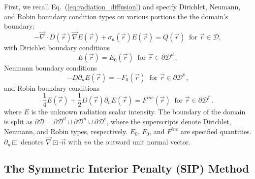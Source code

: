 \documentclass[preprint,10pt]{elsarticle}
\renewcommand{\div}{\vec{\nabla}\! \cdot \!}
\newcommand{\grad}{\vec{\nabla}}
\newcommand{\D}{\mathcal{D}}
\newcommand{\vr}{\vec{r}}
\newcommand{\vn}{\vec{n}}
\newcommand{\eqt}[1]{Eq.~(\ref{#1})}                     %
\begin{document}
First, we recall \eqt{eq:radiation_diffusion} and specify 
Dirichlet, Neumann, and Robin boundary condition types on various portions the the domain's
boundary:
\begin{equation}
  -\div D(\vr) \grad E(\vr) + \sigma_a(\vr) E(\vr) = Q(\vr)\ \textrm{ for } \vr \in \D,
\end{equation}
with Dirichlet boundary conditions
\begin{equation}
  E(\vr)  = E_0(\vr)\ \textrm{ for } \vr \in  \partial \D^d \, ,
\end{equation}
Neumann boundary conditions
\begin{equation}
  -D \partial_n E(\vr) = -F_0(\vr) \ \textrm{ for } \vr \in \partial \D^n,
\end{equation}
and Robin boundary conditions
\begin{equation}
  \frac{1}{4}E(\vr) + \frac{1}{2} D(\vr) \partial_n E(\vr) = F^{inc}(\vr) \ \textrm{ for } \vr \in  \partial \D^r \, .
\end{equation}
%
where $E$ is the unknown radiation scalar intensity. The boundary of the domain is split as
$\partial \D = \partial \D^d \cup \partial \D^n \cup \partial \D^r$,  where the superscripts
denote Dirichlet, Neumann, and Robin types, respectively. $E_0$, $F_0$, and $F^{inc}$ are specified
quantities. $\partial_n \boxdot$ denotes $ \grad \boxdot \cdot \vn$ with $vn$ the outward unit normal vector.


\subsection{The Symmetric Interior Penalty (SIP) Method}
\end{document}
